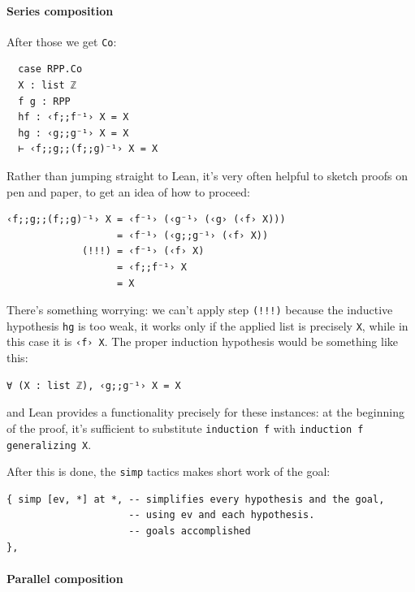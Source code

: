 \documentclass[oneside]{book}
\theoremstyle{definition}
\theoremstyle{remark}
\theoremstyle{plain}
\begin{document}
\paragraph{Series composition}

After those we get \lstinline{Co}:
\begin{lstlisting}
  case RPP.Co
  X : list ℤ
  f g : RPP
  hf : ‹f;;f⁻¹› X = X
  hg : ‹g;;g⁻¹› X = X
  ⊢ ‹f;;g;;(f;;g)⁻¹› X = X
\end{lstlisting}
Rather than jumping straight to Lean,
it's very often helpful to sketch proofs on pen and paper, to get an idea of how to proceed:
\begin{lstlisting}
‹f;;g;;(f;;g)⁻¹› X = ‹f⁻¹› (‹g⁻¹› (‹g› (‹f› X)))
                   = ‹f⁻¹› (‹g;;g⁻¹› (‹f› X))
             (!!!) = ‹f⁻¹› (‹f› X)
                   = ‹f;;f⁻¹› X
                   = X
\end{lstlisting}
There's something worrying:
we can't apply step \lstinline{(!!!)} because the inductive hypothesis \lstinline{hg} is too weak,
it works only if the applied list is precisely \lstinline{X}, while in this case it is \lstinline{‹f› X}.
The proper induction hypothesis would be something like this:
\begin{lstlisting}
∀ (X : list ℤ), ‹g;;g⁻¹› X = X
\end{lstlisting}
and Lean provides a functionality precisely for these instances:
at the beginning of the proof, it's sufficient to substitute \lstinline{induction f} with \lstinline{induction f generalizing X}.

After this is done, the \lstinline{simp} tactics makes short work of the goal:
\begin{lstlisting}
{ simp [ev, *] at *, -- simplifies every hypothesis and the goal,
                     -- using ev and each hypothesis.
                     -- goals accomplished
},
\end{lstlisting}

\paragraph{Parallel composition}
\end{document}
